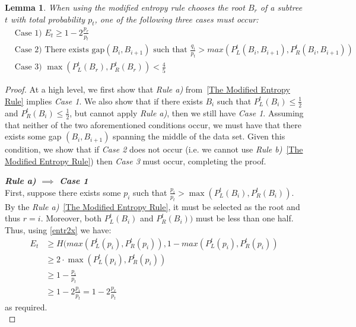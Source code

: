 \documentclass[letterpaper,12pt,titlepage,oneside,final]{book}
\theoremstyle{plain}
\newtheorem{lem}[thm]{Lemma}
\begin{document}
\begin{lem}\label{MECases}
When using the modified entropy rule chooses the root $B_r$ of a subtree $t$ with total probability $p_t$, one of the following three cases must occur: 
\begin{align*}
&\text{Case 1) } E_t \geq 1-2 \frac{p_r}{p_t} \\
&\text{Case 2) There exists gap}  (B_i, B_{i+1}) \text{ such that } \frac{q_i}{p_t} > max(P^t_L(B_i, B_{i+1}), P^t_R(B_i, B_{i+1}))\\
&\text{Case 3) }  \max(P^t_L(B_r), P^t_R(B_r)) < \frac{4}{5}
\end{align*}

\end{lem}
\begin{proof} At a high level, we first show that \textit{Rule a)} from~\ref{The Modified Entropy Rule} implies \textit{Case 1}. We also show that if there exists $B_i$ such that $P^t_L(B_i) \leq \frac{1}{2}$ and $P^t_R(B_i) \leq \frac{1}{2}$, but cannot apply \textit{Rule a)}, then we still have \textit{Case 1}. Assuming that neither of the two aforementioned conditions occur, we must have that there exists some gap $(B_i, B_{i+1})$ spanning the middle of the data set. Given this condition, we show that if \textit{Case 2} does not occur (i.e. we cannot use \textit{Rule b)}~\ref{The Modified Entropy Rule}) then \textit{Case 3} must occur, completing the proof. 


\noindent\textbf{\textit{Rule a) $\implies$ Case 1}} \\
 First, suppose there exists some $p_i$ such that $\frac{p_i}{p_t} > \max(P^t_L(B_i), P^t_R(B_i))$. By the \textit{Rule a)}~\ref{The Modified Entropy Rule}, it must be selected as the root and thus $r=i$. Moreover, both $P^t_L(B_i)$ and $P^t_R(B_i))$ must be less than one half. Thus, using \ref{entr2x} we have: 
\begin{align*}
E_t &\geq H( max(P^t_L(p_i), P^t_R(p_i)), 1-max(P^t_L(p_i), P^t_R(p_i)) \\
 &\geq 2\cdot \max(P^t_L(p_i), P^t_R(p_i)) \\  &\geq 1-\frac{p_i}{p_t} \\ 
 &\geq 1-2 \frac{p_i}{p_t} = 1-2 \frac{p_r}{p_t} 
\end{align*}
 as required. \\
 

\end{proof}
\end{document}
